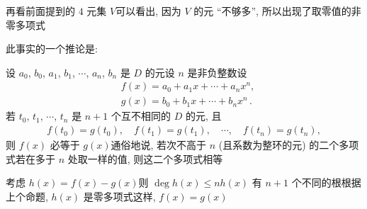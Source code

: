 \begin{remark}
    再看前面提到的 $4$ 元集 $V$\period 可以看出, 因为 $V$ 的元 ``不够多'', 所以出现了取零值的非零多项式\period
\end{remark}

此事实的一个推论是:

\begin{proposition}
    设 $a_0$, $b_0$, $a_1$, $b_1$, $\cdots$, $a_n$, $b_n$ 是 $D$ 的元\period 设 $n$ 是非负整数\period 设
    \begin{align*}
         & f(x) = a_0 + a_1 x + \cdots + a_n x^n,        \\
         & g(x) = b_0 + b_1 x + \cdots + b_n x^n \period
    \end{align*}
    若 $t_0$, $t_1$, $\cdots$, $t_n$ 是 $n+1$ 个互不相同的 $D$ 的元, 且
    \begin{align*}
        f(t_0) = g(t_0), \quad f(t_1) = g(t_1), \quad \cdots, \quad f(t_n) = g(t_n),
    \end{align*}
    则 $f(x)$ 必等于 $g(x)$\period 通俗地说, 若次不高于 $n$ (且系数为整环的元) 的二个多项式若在多于 $n$ 处取一样的值, 则这二个多项式相等\period
\end{proposition}

\begin{pf}
    考虑 $h(x) = f(x) - g(x)$\period 则 $\deg h(x) \leq n$\period $h(x)$ 有 $n+1$ 个不同的根\period 根据上个命题, $h(x)$ 是零多项式\period 这样, $f(x) = g(x)$\period
\end{pf}
